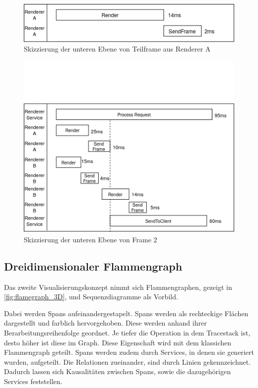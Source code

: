 \begin{figure}[!ht]
	\centering
	\includegraphics[scale=0.8]{img/Design/FrameGalerieUntereEbene2.png}
	\caption[Untere Ebene der Frame Galerie: Beispiel 2]{ Skizzierung der unteren Ebene von Teilframe aus Renderer A}
	\label{fig:FrameGalerieUntereEbene1}
\end{figure}
\begin{figure}[!ht]
	\centering
	\includegraphics[scale=0.8]{img/Design/FrameGalerieUntereEbene1.png}
	\caption[Untere Ebene der Frame Galerie: Beispiel 1]{ Skizzierung der unteren Ebene von Frame 2}
	\label{fig:FrameGalerieUntereEbene2}
\end{figure}

\subsection{Dreidimensionaler Flammengraph}
\label{subsection:Dreidimensionale Flammengraphen}

Das zweite Visualisierungskonzept nimmt sich Flammengraphen, gezeigt in \cref{fig:flamegraph_3D}, und Sequenzdiagramme als Vorbild.

Dabei werden Spans aufeinandergestapelt. Spans werden als rechteckige Flächen dargestellt und farblich hervorgehoben.	Diese werden anhand ihrer Berarbeitungsreihenfolge geordnet. Je tiefer die Operation in dem Tracestack ist, desto höher ist diese im Graph. Diese Eigenschaft wird mit dem klassichen Flammengraph geteilt. Spans werden zudem durch Services, in denen sie generiert wurden, aufgeteilt. Die Relationen zueinander, sind durch Linien gekennzeichnet. Dadurch lassen sich Kausalitäten zwischen Spans, sowie die dazugehörigen Services feststellen.

